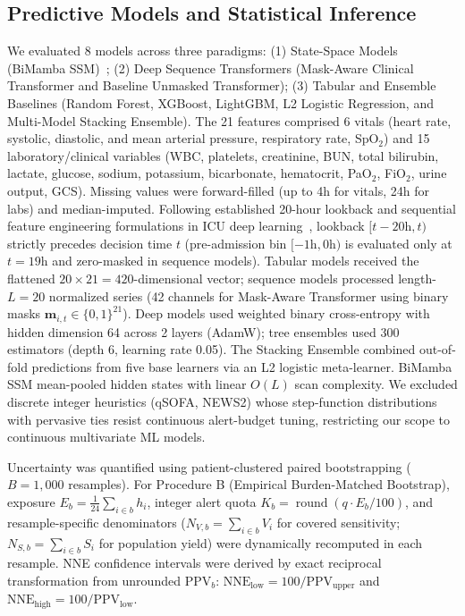 \documentclass[12pt,a4paper]{article}
\begin{document}
\subsection{Predictive Models and Statistical Inference}
We evaluated 8 models across three paradigms: (1) State-Space Models (BiMamba SSM)~\cite{gu2023mamba,gu2022efficiently}; (2) Deep Sequence Transformers (Mask-Aware Clinical Transformer and Baseline Unmasked Transformer); (3) Tabular and Ensemble Baselines (Random Forest, XGBoost, LightGBM, L2 Logistic Regression, and Multi-Model Stacking Ensemble). The 21 features comprised 6 vitals (heart rate, systolic, diastolic, and mean arterial pressure, respiratory rate, SpO$_2$) and 15 laboratory/clinical variables (WBC, platelets, creatinine, BUN, total bilirubin, lactate, glucose, sodium, potassium, bicarbonate, hematocrit, PaO$_2$, FiO$_2$, urine output, GCS). Missing values were forward-filled (up to 4h for vitals, 24h for labs) and median-imputed. Following established 20-hour lookback and sequential feature engineering formulations in ICU deep learning~\cite{shayan2025enhanced}, lookback $[t-20\text{h}, t)$ strictly precedes decision time $t$ (pre-admission bin $[-1\text{h}, 0\text{h})$ is evaluated only at $t=19\text{h}$ and zero-masked in sequence models). Tabular models received the flattened $20 \times 21 = 420$-dimensional vector; sequence models processed length-$L=20$ normalized series (42 channels for Mask-Aware Transformer using binary masks $\mathbf{m}_{i,t} \in \{0, 1\}^{21}$). Deep models used weighted binary cross-entropy with hidden dimension 64 across 2 layers (AdamW); tree ensembles used 300 estimators (depth 6, learning rate 0.05). The Stacking Ensemble combined out-of-fold predictions from five base learners via an L2 logistic meta-learner. BiMamba SSM mean-pooled hidden states with linear $O(L)$ scan complexity. We excluded discrete integer heuristics (qSOFA, NEWS2) whose step-function distributions with pervasive ties resist continuous alert-budget tuning, restricting our scope to continuous multivariate ML models.

Uncertainty was quantified using patient-clustered paired bootstrapping ($B=1,000$ resamples). For Procedure B (Empirical Burden-Matched Bootstrap), exposure $E_b = \frac{1}{24}\sum_{i\in b} h_i$, integer alert quota $K_b = \operatorname{round}(q \cdot E_b / 100)$, and resample-specific denominators ($N_{V,b} = \sum_{i \in b} V_i$ for covered sensitivity; $N_{S,b} = \sum_{i \in b} S_i$ for population yield) were dynamically recomputed in each resample. NNE confidence intervals were derived by exact reciprocal transformation from unrounded $\text{PPV}_b$: $\text{NNE}_{\text{low}} = 100 / \text{PPV}_{\text{upper}}$ and $\text{NNE}_{\text{high}} = 100 / \text{PPV}_{\text{low}}$.
\end{document}
